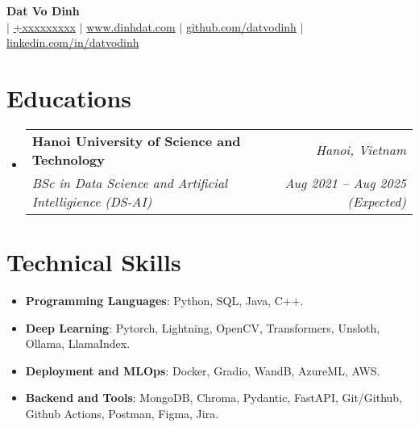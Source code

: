 \documentclass[letterpaper,11pt]{article}
\makeatletter
\newcommand{\resumeitem}[1]{
  \item\small{
    #1 \vspace{-2pt}
  }
}
\newcommand{\resumeSubheading}[4]{
  \vspace{-1pt}\item
    \begin{tabular*}{0.97\textwidth}[t]{l@{\extracolsep{\fill}}r}
      \textbf{#1} & \textit{#2} \\
      \textit{\small#3} & \textit{\small #4} \\
    \end{tabular*}\vspace{-6pt}
}
\newcommand{\resumeSubHeadingListStart}{\begin{itemize}[leftmargin=*,label={}]}
\newcommand{\resumeSubHeadingListEnd}{\end{itemize}}
\newcommand{\resumeItemListStart}{\begin{itemize}}
\newcommand{\resumeItemListEnd}{\end{itemize}\vspace{-5pt}}
\makeatother
\begin{document}

\begin{flushleft}
  \textbf{\huge {Dat Vo Dinh}} \\ \vspace{4pt}
   $|$ \href{tel:+xxxxxxxxx}{{+xxxxxxxxx}} $|$ \href{https://dinhdat.com}{{www.dinhdat.com}}
  $|$ \href{https://github.com/datvodinh/}{{github.com/datvodinh}} $|$ \href{www.linkedin.com/in/datvodinh}{{linkedin.com/in/datvodinh}}
\end{flushleft}

\section{Educations}
  \resumeSubHeadingListStart
    \resumeSubheading
      {Hanoi University of Science and Technology}{\textit{Hanoi, Vietnam}}
      {BSc in Data Science and Artificial Intelligience (DS-AI)}{Aug 2021 -- Aug 2025 (Expected)}
  \resumeSubHeadingListEnd

  
\section{Technical Skills}
\resumeItemListStart[leftmargin=*,label={}]
  \resumeitem{\textbf{Programming Languages}: {Python, SQL, Java, C++.}} \\[-\baselineskip]
  \resumeitem{\textbf{Deep Learning}: {Pytorch, Lightning, OpenCV, Transformers, Unsloth, Ollama, LlamaIndex.}} \\[-\baselineskip]
  \resumeitem{\textbf{Deployment and MLOps}: {Docker, Gradio, WandB, AzureML, AWS.}} \\[-\baselineskip]
  \resumeitem{\textbf{Backend and Tools}: {MongoDB, Chroma, Pydantic, FastAPI, Git/Github, Github Actions, Postman, Figma, Jira.}} \\[-\baselineskip]
\resumeItemListEnd
\end{document}
